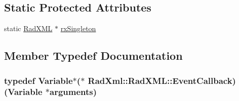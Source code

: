 \subsection*{Static Protected Attributes}
\begin{DoxyCompactItemize}
\item 
static \hyperlink{class_rad_xml_1_1_rad_x_m_l}{Rad\-X\-M\-L} $\ast$ \hyperlink{class_rad_xml_1_1_rad_x_m_l_af032b79665601e415b911c3d545383e2}{rx\-Singleton}
\end{DoxyCompactItemize}


\subsection{Member Typedef Documentation}
\hypertarget{class_rad_xml_1_1_rad_x_m_l_ab812a58a3bf015e646979a83309db244}{
\subsubsection[{Event\-Callback}]{\setlength{\rightskip}{0pt plus 5cm}typedef {\bf Variable}$\ast$($\ast$ Rad\-Xml\-::\-Rad\-X\-M\-L\-::\-Event\-Callback)({\bf Variable} $\ast$arguments)}}\label{class_rad_xml_1_1_rad_x_m_l_ab812a58a3bf015e646979a83309db244}



